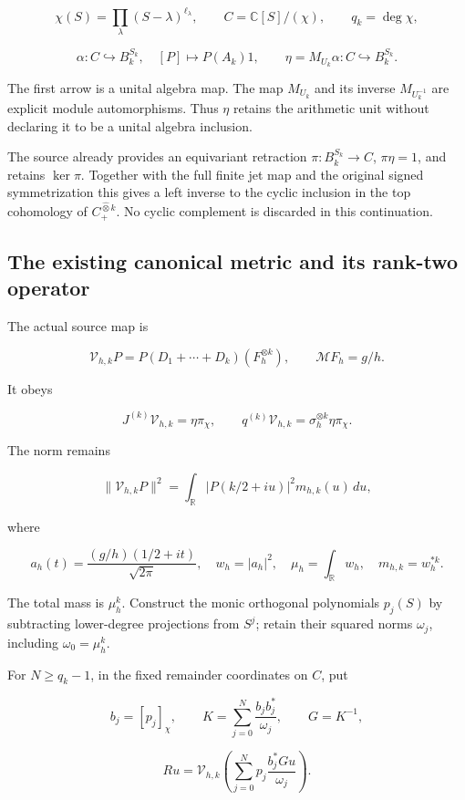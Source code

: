 \[
\chi(S)=\prod_\lambda(S-\lambda)^{\ell_\lambda},
\qquad C=\mathbb C[S]/(\chi),\qquad q_k=\deg\chi,
\]

\[
\alpha:C\hookrightarrow B_k^{S_k},\quad[P]\mapsto P(A_k)1,
\qquad
\eta=M_{U_k}\alpha:C\hookrightarrow B_k^{S_k}.
\]

The first arrow is a unital algebra map. The map \(M_{U_k}\) and its
inverse \(M_{U_k^{-1}}\) are explicit module automorphisms. Thus
\(\eta\) retains the arithmetic unit without declaring it to be a unital
algebra inclusion.

The source already provides an equivariant retraction
\(\pi:B_k^{S_k}\to C\), \(\pi\eta=1\), and retains \(\ker\pi\). Together
with the full finite jet map and the original signed symmetrization this
gives a left inverse to the cyclic inclusion in the top cohomology of
\(C_+^{\widehat\otimes k}\). No cyclic complement is discarded in this
continuation.

\subsection{The existing canonical metric and its rank-two
operator}\label{exttrace-the-existing-canonical-metric-and-its-rank-two-operator}

The actual source map is

\[
\mathcal V_{h,k}P=P(D_1+\cdots+D_k)(F_h^{\otimes k}),
\qquad \mathcal MF_h=g/h.
\]

It obeys

\[
J^{(k)}\mathcal V_{h,k}=\eta\pi_\chi,
\qquad
q^{(k)}\mathcal V_{h,k}=\sigma_h^{\otimes k}\eta\pi_\chi.
\]

The norm remains

\[
\|\mathcal V_{h,k}P\|^2
=\int_{\mathbb R}|P(k/2+iu)|^2m_{h,k}(u)\,du,
\]

where

\[
a_h(t)=\frac{(g/h)(1/2+it)}{\sqrt{2\pi}},
\quad w_h=|a_h|^2,
\quad\mu_h=\int_{\mathbb R}w_h,
\quad m_{h,k}=w_h^{*k}.
\]

The total mass is \(\mu_h^k\). Construct the monic orthogonal
polynomials \(p_j(S)\) by subtracting lower-degree projections from
\(S^j\); retain their squared norms \(\omega_j\), including
\(\omega_0=\mu_h^k\).

For \(N\geq q_k-1\), in the fixed remainder coordinates on \(C\), put

\[
b_j=[p_j]_\chi,\qquad
K=\sum_{j=0}^{N}\frac{b_jb_j^*}{\omega_j},\qquad G=K^{-1},
\]

\[
R u=\mathcal V_{h,k}
\left(\sum_{j=0}^{N}p_j\frac{b_j^*Gu}{\omega_j}\right).
\]

